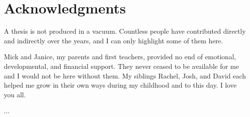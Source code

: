 \chapter{Acknowledgments} %

A thesis is not produced in a vacuum.
Countless people have contributed directly and indirectly over the years, and I can only highlight some of them here.

Mick and Janice, my parents and first teachers, provided no end of emotional, developmental, and financial support.
They never ceased to be available for me and I would not be here without them.
My siblings Rachel, Josh, and David each helped me grow in their own ways during my childhood and to this day.
I love you all.

...

